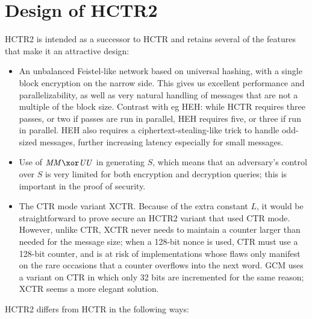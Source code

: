 \documentclass[hctr2.tex]{subfiles}
\begin{document}
\section{Design of HCTR2}\label{design}
HCTR2 is intended as a successor to HCTR and retains several of the
features that make it an attractive design:
\begin{itemize}
    \item An unbalanced Feistel-like network based on universal
    hashing, with a single block encryption on the narrow side.
    This gives us excellent performance and parallelizability,
    as well as very natural handling of messages that are not
    a multiple of the block size. Contrast with eg HEH\cite{heh}:
    while HCTR requires three passes, or two if passes are
    run in parallel, HEH requires five, or three if run in parallel.
    HEH also requires a ciphertext-stealing-like trick to
    handle odd-sized messages, further increasing
    latency especially for small messages.
    \item Use of \(\MM \xor \UU\) in generating \(S\), which means
    that an adversary's control over \(S\) is very limited for both
    encryption and decryption queries; this is important in the
    proof of security.
    \item The CTR mode variant XCTR.
    Because of the extra constant \(L\), it would be straightforward
    to prove secure an HCTR2 variant that used CTR mode.
    However, unlike CTR, XCTR
    never needs to maintain a counter larger
    than needed for the message size;
    when a 128-bit nonce is used, CTR 
    must use a 128-bit counter, and is
    at risk of implementations
    whose flaws only manifest on the
    rare occasions that a counter overflows
    into the next word.
    GCM\cite{gcm} uses a variant on CTR
    in which only 32 bits are incremented
    for the same reason;
    XCTR seems a more elegant solution.
\end{itemize}

HCTR2 differs from HCTR in the following ways:
\end{document}
